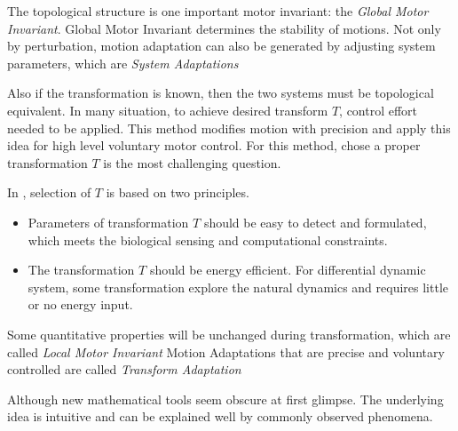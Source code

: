 The topological structure is one important motor invariant: the \emph{Global Motor Invariant}.
Global Motor Invariant determines the stability of motions.
Not only by perturbation, motion adaptation can also be generated by adjusting system parameters, which are \emph{System Adaptations}





Also if the transformation is known, then the two systems must be topological equivalent.
In many situation, to achieve desired transform $T$, control effort needed to be applied.
This method  modifies motion with precision and \moit apply this idea for high level voluntary motor control.
For this method, chose a proper transformation $T$ is the most challenging  question.

In \moit, selection of $T$ is based on two principles.
\begin{itemize}
\item
Parameters of transformation $T$ should be easy to detect and formulated, which meets the biological sensing and computational constraints. 

\item 
The transformation $T$ should be energy efficient.
For differential dynamic system, some transformation explore the natural dynamics and requires little or no energy input.
\end{itemize}

Some quantitative properties will be unchanged during transformation, which are called \emph{Local Motor Invariant}
Motion Adaptations that are precise and voluntary controlled are called \emph{Transform Adaptation}





%
%
%
%
%




Although new mathematical tools seem obscure at first glimpse.
The underlying idea is intuitive and can be explained well by commonly observed phenomena.




